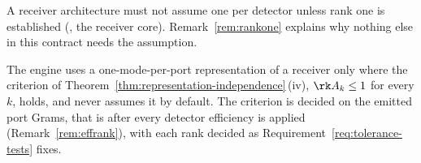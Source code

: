 
A receiver architecture must not assume one  per detector
unless rank one is established
(, the receiver core).
Remark~\ref{rem:rankone} explains why nothing else in this contract needs
the assumption.

\begin{requirement}\label{req:one-mode-per-port}
The engine uses a one-mode-per-port representation of a receiver only where
the criterion of Theorem~\ref{thm:representation-independence}\,(iv), $\rk A_k\le1$ for every $k$,
holds, and never assumes it by default. The criterion is decided on the
emitted port Grams, that is after every detector efficiency is applied
(Remark~\ref{rem:effrank}), with each rank decided as
Requirement~\ref{req:tolerance-tests} fixes.
\end{requirement}

